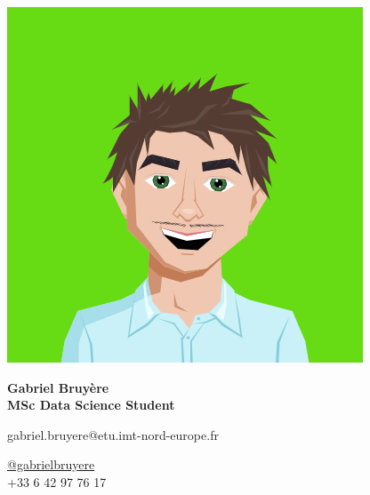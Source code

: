 \documentclass{article}
\begin{document}
\centering \includegraphics[width=.2\linewidth]{hero.png}\\[1pt]
\parbox{2in}{\Large \centering \textbf{Gabriel Bruyère}\\[1pt]
\normalsize \textbf{MSc Data Science Student}}

\vfill
\raggedright
\begin{multicols}{2}
gabriel.bruyere@etu.imt-nord-europe.fr

\columnbreak
\raggedleft
\href{https://gabrielbruyere.github.io/}{@gabrielbruyere}\\
+33 6 42 97 76 17%
\end{multicols}%
\end{document}
